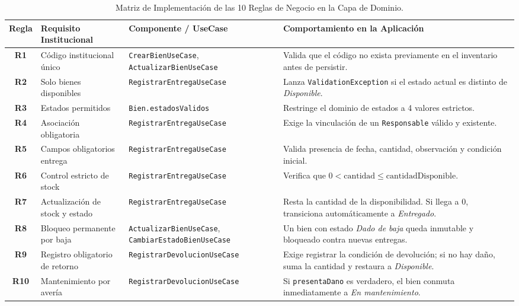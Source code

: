 \documentclass[12pt,a4paper]{article}
\begin{document}
\begin{table}[H]
\centering
\caption{Matriz de Implementación de las 10 Reglas de Negocio en la Capa de Dominio.}
\vspace{0.2cm}
\begin{tabularx}{\textwidth}{|c|p{4.5cm}|p{4cm}|X|}
\hline
\rowcolor[HTML]{E2E8F0} 
\textbf{Regla} & \textbf{Requisito Institucional} & \textbf{Componente / UseCase} & \textbf{Comportamiento en la Aplicación} \\ \hline
\textbf{R1} & Código institucional único & \texttt{CrearBienUseCase}, \texttt{ActualizarBienUseCase} & Valida que el código no exista previamente en el inventario antes de persistir. \\ \hline
\textbf{R2} & Solo bienes disponibles & \texttt{RegistrarEntregaUseCase} & Lanza \texttt{ValidationException} si el estado actual es distinto de \textit{Disponible}. \\ \hline
\textbf{R3} & Estados permitidos & \texttt{Bien.estadosValidos} & Restringe el dominio de estados a 4 valores estrictos. \\ \hline
\textbf{R4} & Asociación obligatoria & \texttt{RegistrarEntregaUseCase} & Exige la vinculación de un \texttt{Responsable} válido y existente. \\ \hline
\textbf{R5} & Campos obligatorios entrega & \texttt{RegistrarEntregaUseCase} & Valida presencia de fecha, cantidad, observación y condición inicial. \\ \hline
\textbf{R6} & Control estricto de stock & \texttt{RegistrarEntregaUseCase} & Verifica que $0 < \text{cantidad} \le \text{cantidadDisponible}$. \\ \hline
\textbf{R7} & Actualización de stock y estado & \texttt{RegistrarEntregaUseCase} & Resta la cantidad de la disponibilidad. Si llega a 0, transiciona automáticamente a \textit{Entregado}. \\ \hline
\textbf{R8} & Bloqueo permanente por baja & \texttt{ActualizarBienUseCase}, \texttt{CambiarEstadoBienUseCase} & Un bien con estado \textit{Dado de baja} queda inmutable y bloqueado contra nuevas entregas. \\ \hline
\textbf{R9} & Registro obligatorio de retorno & \texttt{RegistrarDevolucionUseCase} & Exige registrar la condición de devolución; si no hay daño, suma la cantidad y restaura a \textit{Disponible}. \\ \hline
\textbf{R10} & Mantenimiento por avería & \texttt{RegistrarDevolucionUseCase} & Si \texttt{presentaDano} es verdadero, el bien conmuta inmediatamente a \textit{En mantenimiento}. \\ \hline
\end{tabularx}
\end{table}
\end{document}
